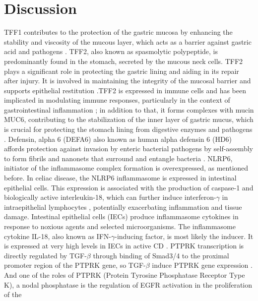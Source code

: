 \documentclass[12pt]{article}
\begin{document}
\section{Discussion}
TFF1 contributes to the protection of the gastric mucosa by enhancing the stability and viscosity of the mucous layer, which acts as a barrier against gastric acid and pathogens \supercite{braga2020structure}. TFF2, also known as spasmolytic polypeptide, is predominantly found in the stomach, secreted by the mucous neck cells. TFF2 plays a significant role in protecting the gastric lining and aiding in its repair after injury. It is involved in maintaining the integrity of the mucosal barrier and supports epithelial restitution \supercite{aihara2017trefoil}.TFF2 is expressed in immune cells and has been implicated in modulating immune responses, particularly in the context of gastrointestinal inflammation \supercite{hoffmann2021trefoil}; in addition to that, it forms complexes with mucin MUC6, contributing to the stabilization of the inner layer of gastric mucus, which is crucial for protecting the stomach lining from digestive enzymes and pathogens \supercite{hoffmann2021trefoil}. Defensin, alpha 6 (DEFA6) also known as human alpha defensin 6 (HD6) affords protection against invasion by enteric bacterial pathogens by self-assembly to form fibrils and nanonets that surround and entangle bacteria \supercite{chu2012human}. NLRP6, initiator of the inflammasome
complex formation is overexpressed, as mentioned before. In celiac disease, the NLRP6 inflammasome is expressed in intestinal epithelial cells. This expression is associated with the production of caspase-1 and biologically active interleukin-18, which can further induce interferon-$\gamma$ in intraepithelial lymphocytes
\supercite{pietz2017immunopathology}, potentially exacerbating inflammation and tissue damage. Intestinal epithelial cells (IECs) produce inflammasome cytokines in response to noxious agents and selected microorganisms. The inflammasome cytokine IL-18, also known as
IFN-$\gamma$-inducing factor, is most likely the inducer. It is expressed at very high levels in IECs in
active CD \supercite{pietz2017immunopathology}. PTPRK transcription is directly regulated by TGF-$\beta$ through binding of Smad3/4 to the proximal promoter region of the PTPRK gene, so TGF-$\beta$ induce PTPRK gene expression \supercite{xu2015notch}. And one of the roles of PTPRK (Protein Tyrosine Phosphatase Receptor
Type K), a nodal phosphatase is the regulation of EGFR activation in the proliferation of the
\end{document}
